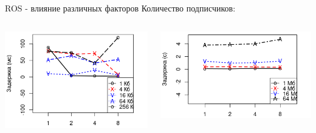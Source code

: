 \begin{frame}{ROS - влияние различных факторов}
	Количество подписчиков:
	\begin{columns}[onlytextwidth]
		\begin{column}{0.45\textwidth}
			\includegraphics[width=\textwidth]{img/ros/ros_subs_l_k.png}
		\end{column}
		\begin{column}{0.45\textwidth}
			\includegraphics[width=\textwidth]{img/ros/ros_subs_l_m.png}
		\end{column}
	\end{columns}
\end{frame}

